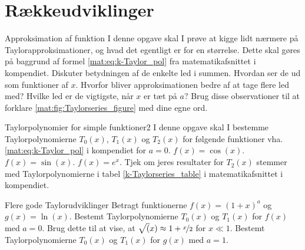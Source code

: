 \section*{Rækkeudviklinger}
\begin{opgave}[1]{Approksimation af funktion}
	I denne opgave skal I prøve at kigge lidt nærmere på Taylorapproksimationer, og hvad det egentligt er for en størrelse. Dette skal gøres på baggrund af formel \eqref{mat:eq:k-Taylor_pol} fra matematikafsnittet i kompendiet.
	\opg Diskuter betydningen af de enkelte led i summen. Hvordan ser de
	ud som funktioner af $x$.
	\opg Hvorfor bliver approksimationen bedre af at tage flere led med?
	\opg Hvilke led er de vigtigste, når $x$ er tæt på $a$?
	\opg Brug disse observationer til at forklare \cref{mat:fig:Taylorseries_figure} med dine egne ord.
\end{opgave}	
\begin{opgave}[2]{Taylorpolynomier for simple funktioner}{2}
I denne opgave skal I bestemme Taylorpolynomierne $T_0(x)$, $T_1(x)$ og $T_2(x)$ for følgende funktioner vha. \cref{mat:eq:k-Taylor_pol} i kompendiet for $a=0$.
\opg $f(x) = \cos(x)$.
\opg $f(x) = \sin(x)$.
\opg $f(x) = e^x$.
\opg Tjek om jeres resultater for $T_2(x)$ stemmer med Taylorpolynomierne i tabel \ref{k-Taylorseries_table} i matematikafsnittet i kompendiet. 
\end{opgave}
\begin{opgave}[3]{Flere gode Taylorudviklinger}
Betragt funktionerne $f(x) = (1+x)^{a}$ og $g(x) = \ln(x)$.
\opg Bestemt Taylorpolynomierne $T_0(x)$ og $T_1(x)$ for $f(x)$ med $a=0$.
\opg Brug dette til at vise, at $\sqrt(x) \approx 1+\nicefrac{x}{2}$ for $x\ll1$.
\opg Bestemt Taylorpolynomierne $T_0(x)$ og $T_1(x)$ for $g(x)$ med $a=1$.
\end{opgave}